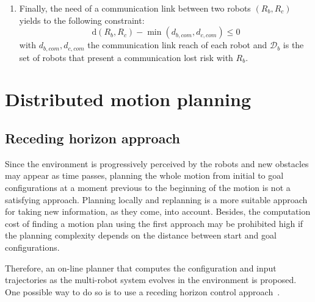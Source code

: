 \documentclass[eprint]{actapoly}
\begin{document}
\begin{enumerate}
    \item Finally, the need of a communication link between two robots $(R_b, R_c)$ yields to
    the following constraint:
    \begin{equation}\label{eq:com}
    	\mathrm{d}(R_b,R_c)  - \min(d_{b,com}, d_{c,com}) \leq 0
    \end{equation}
    with $d_{b,com}, d_{c,com}$ the communication link reach of each robot and
    $\mathcal{D}_b$ is the set of robots that present a communication lost risk with
    $R_b$.
\end{enumerate}



\section{Distributed motion planning}



\subsection{Receding horizon approach}\label{subsec:rha}


Since the environment is progressively perceived by the robots and new obstacles may appear as time passes,
planning the whole motion from initial to goal configurations at a moment
previous to the beginning of the motion is
not a satisfying approach. Planning locally and replanning is 
a more suitable approach for taking new information, as they come, into account. Besides, the computation cost of finding a motion plan using
the first approach may be prohibited high if the planning complexity depends
on the distance between start and goal configurations.


Therefore, an on-line planner that computes the configuration and input 
trajectories as the multi-robot system evolves in the environment is proposed.
One possible way to do so is to use a receding horizon control approach~\cite{Keviczky2006}.
\end{document}
